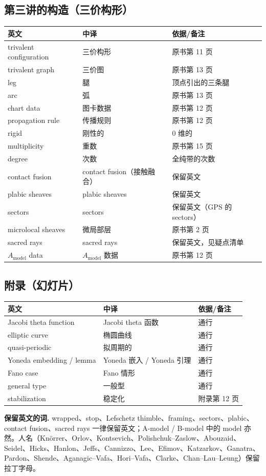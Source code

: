 \subsection*{第三讲的构造（三价构形）}
\begin{longtable}{p{}p{}p{}}
\toprule
英文 & 中译 & 依据/备注\\
\midrule
\endhead
trivalent configuration & 三价构形 & 原书第 11 页\\
trivalent graph & 三价图 & 原书第 13 页\\
leg & 腿 & 顶点引出的三条腿\\
arc & 弧 & 原书第 13 页\\
chart data & 图卡数据 & 原书第 12 页\\
propagation rule & 传播规则 & 原书第 12 页\\
rigid & 刚性的 & 0 维的\\
multiplicity & 重数 & 原书第 15 页\\
degree & 次数 & 全纯带的次数\\
contact fusion & contact fusion（接触融合） & 保留英文\\
plabic sheaves & plabic sheaves & 保留英文\\
sectors & sectors & 保留英文（GPS 的 sectors）\\
microlocal sheaves & 微局部层 & 原书第 2 页\\
sacred rays & sacred rays & 保留英文，见疑点清单\\
$A_{\mathrm{model}}$ data & $A_{\mathrm{model}}$ 数据 & 原书第 12 页\\
\bottomrule
\end{longtable}

\subsection*{附录（幻灯片）}
\begin{longtable}{p{}p{}p{}}
\toprule
英文 & 中译 & 依据/备注\\
\midrule
\endhead
Jacobi theta function & Jacobi theta 函数 & 通行\\
elliptic curve & 椭圆曲线 & 通行\\
quasi-periodic & 拟周期的 & 通行\\
Yoneda embedding / lemma & Yoneda 嵌入 / Yoneda 引理 & 通行\\
Fano case & Fano 情形 & 通行\\
general type & 一般型 & 通行\\
stabilization & 稳定化 & 附录第 12 页\\
\bottomrule
\end{longtable}

\noindent\textbf{保留英文的词.} wrapped、stop、Lefschetz thimble、framing、sectors、plabic、contact fusion、sacred rays 一律保留英文；A-model / B-model 中的 model 亦然。人名（Kn\"orrer、Orlov、Kontsevich、Polishchuk--Zaslow、Abouzaid、Seidel、Hicks、Hanlon、Jeffs、Cannizzo、Lee、Efimov、Katzarkov、Ganatra、Pardon、Shende、Aganagic--Vafa、Hori--Vafa、Clarke、Chan--Lau--Leung）保留拉丁字母。

